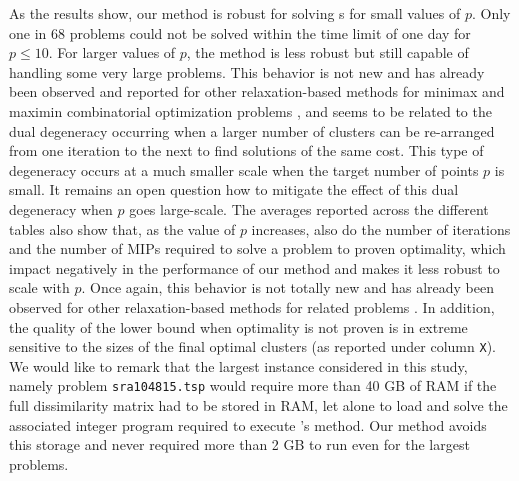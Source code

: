 \documentclass[ijoo,nonblindrev]{informs-ijoo}
\begin{document}
As the results show, our method is robust for solving \pDP{}s for small values of $p$. Only one in 68 problems could not be solved within the time limit of one day for $p\leq 10$. For larger values of $p$, the method is less robust but still capable of handling some very large problems. This behavior is not new and has already been observed and reported for other relaxation-based methods for minimax and maximin combinatorial optimization problems \citep{Aloise2018sampling, Contardo2019scalable}, and seems to be related to the dual degeneracy occurring when a larger number of clusters can be re-arranged from one iteration to the next to find solutions of the same cost. This type of degeneracy occurs at a much smaller scale when the target number of points $p$ is small. It remains an open question how to mitigate the effect of this dual degeneracy when $p$ goes large-scale. The averages reported across the different tables also show that, as the value of $p$ increases, also do the number of iterations and the number of MIPs required to solve a problem to proven optimality, which impact negatively in the performance of our method and makes it less robust to scale with $p$. Once again, this behavior is not totally new and has already been observed for other relaxation-based methods for related problems \citep[see, for instance,][]{Contardo2019scalable, Aloise2018sampling}. In addition, the quality of the lower bound when optimality is not proven is in extreme sensitive to the sizes of the final optimal clusters (as reported under column \texttt{X}). We would like to remark that the largest instance considered in this study, namely problem \texttt{sra104815.tsp} would require more than 40 GB of RAM if the full dissimilarity matrix had to be stored in RAM, let alone to load and solve the associated integer program required to execute \citeauthor{Sayah2017new}'s method. Our method avoids this storage and never required more than 2 GB to run even for the largest problems.
\end{document}
